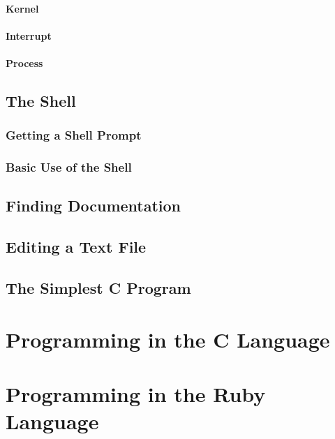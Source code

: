\documentclass[twocolumn]{book}
\begin{document}
\subsubsection{Kernel}

\subsubsection{Interrupt}

\subsubsection{Process}

\section{The Shell}

\subsection{Getting a Shell Prompt}

\subsection{Basic Use of the Shell}

\section{Finding Documentation}

\section{Editing a Text File}

\section{The Simplest C Program}

\chapter{Programming in the C Language}

\chapter{Programming in the Ruby Language}
\end{document}
